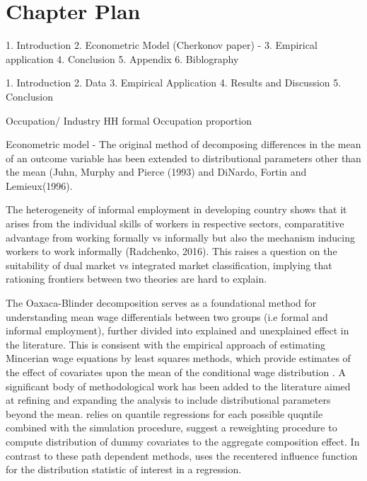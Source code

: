 \section{Chapter Plan}

1. Introduction 
2. Econometric Model (Cherkonov paper) 
- 
3. Empirical application
4. Conclusion
5. Appendix
6. Biblography

1. Introduction
2. Data
3. Empirical Application
4. Results and Discussion
5. Conclusion


Occupation/ Industry
HH formal
Occupation proportion


Econometric model
- The original method of decomposing differences in the mean of an outcome variable has been extended to distributional parameters other than the mean (Juhn, Murphy and Pierce (1993) and DiNardo, Fortin and Lemieux(1996).   

The heterogeneity of informal employment in developing country shows that it arises from the individual skills of workers in respective sectors, comparatitive advantage from working formally vs informally but also the mechanism inducing workers to work informally (Radchenko, 2016). This raises a question on the suitability of dual market vs integrated market classification, implying that rationing frontiers between two theories are hard to explain. 


The Oaxaca-Blinder decomposition serves as a foundational method for understanding mean wage differentials between two groups (i.e formal and informal employment), further divided into explained and unexplained effect in the literature. This is consisent with the empirical approach of estimating Mincerian wage equations by least squares methods, which provide estimates of the effect of covariates upon the mean of the conditional wage distribution \parencite{Machado2005}. A significant body of methodological work has been added to the literature aimed at refining and expanding the analysis to include distributional parameters beyond the mean.  \textcite{Machado2005} relies on quantile regressions for each possible quqntile combined with the simulation procedure, \textcite{DiNardo1996} suggest a reweighting procedure to compute distribution of dummy covariates to the aggregate composition effect. In contrast to these path dependent methods, \textcite{Firpo2009} uses the recentered influence function for the distribution statistic of interest in a regression. 


